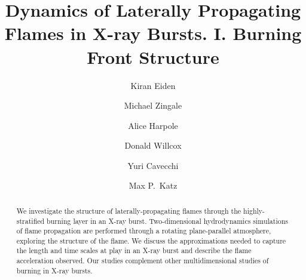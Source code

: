 \documentclass[trackchanges,preprint,times,tighten]{aastex63}
\begin{document}
\title{Dynamics of Laterally Propagating Flames in X-ray Bursts. I. Burning Front Structure}


\author[0000-0001-6191-4285]{Kiran Eiden}

\author[0000-0001-8401-030X]{Michael Zingale}

\author[0000-0002-1530-781X]{Alice Harpole}

\author[0000-0003-2300-5165]{Donald Willcox}

\author[0000-0002-6447-3603]{Yuri Cavecchi}

\author[0000-0003-0439-4556]{Max P.\ Katz}



\begin{abstract}
We investigate the structure of laterally-propagating flames through
the highly-stratified burning layer in an X-ray burst.
Two-dimensional hydrodynamics simulations of flame propagation are
performed through a rotating plane-parallel atmosphere, exploring the
structure of the flame.  We discuss the approximations needed to
capture the length and time scales at play in an X-ray burst and
describe the flame acceleration observed.  Our studies complement
other multidimensional studies of burning in X-ray bursts.
\end{abstract}

\end{document}
